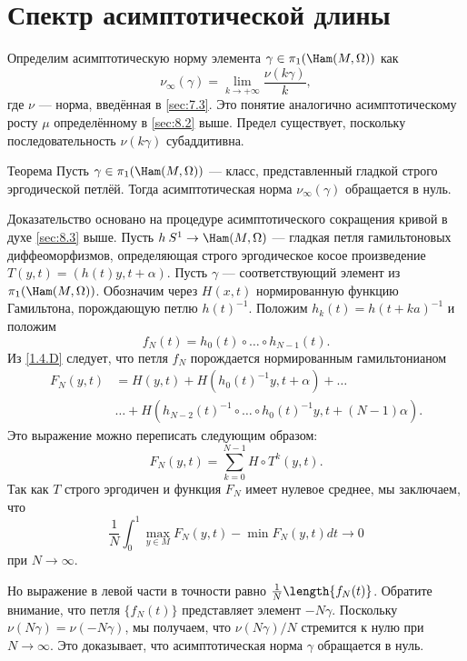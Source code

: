 \section{Спектр асимптотической длины}
Определим асимптотическую норму элемента $\gamma\in\pi_1(\Ham(M, \Omega))$ как
\[\nu_\infty(\gamma)=\lim_{k\to+\infty}\frac{\nu(k\gamma)}{k},\]
где $\nu$ --- норма, введённая в \ref{sec:7.3}. 
Это понятие аналогично асимптотическому росту $\mu$ определённому в \ref{sec:8.2} выше.
Предел существует, поскольку последовательность $\nu(k\gamma)$ субаддитивна.

\begin{thm}{Теорема}\label{11.2.A}
Пусть $\gamma\in\pi_1(\Ham(M,\Omega))$ --- класс, представленный гладкой строго эргодической петлёй.
Тогда асимптотическая норма $\nu_\infty ​​(\gamma)$ обращается в нуль.
\end{thm}

Доказательство основано на процедуре асимптотического сокращения кривой в духе \ref{sec:8.3} выше.
Пусть $h\: S^1 \to \Ham(M,\Omega)$ --- гладкая петля гамильтоновых диффеоморфизмов, определяющая строго эргодическое косое произведение $T(y, t) = (h(t)y, t+\alpha)$.
Пусть $\gamma$ --- соответствующий элемент из $\pi_1(\Ham(M, \Omega))$.
Обозначим через $H(x, t)$ нормированную функцию Гамильтона, порождающую петлю $h(t)^{-1}$.
Положим $h_k(t) = h(t + ka)^{-1}$ и положим 
\[f_N(t) = h_0(t) \circ \dots \circ h_{N-1}(t).\]
Из \ref{1.4.D} следует, что петля $f_N$ порождается нормированным гамильтонианом 
\begin{align*}
F_N(y,t)
&=
H(y,t)
+ H(h_0(t)^{-1}y,t+\alpha)
+\dots
\\
&\dots
+
H(h_{N-2} (t)^{-1} \circ \dots\circ h_0(t)^{-1}y, t + (N - 1)\alpha).
\end{align*}
Это выражение можно переписать следующим образом:
\[F_N(y, t) = \sum_{k=0}^{N-1} H\circ T^k(y, t).\]
Так как $T$ строго эргодичен и функция $F_N$ имеет нулевое среднее, мы заключаем, что
\[\frac1N\int_0^1\max_{y\in M}F_N(y, t) - \min F_N(y, t) dt \to 0\]
при $N \to \infty$.

Но выражение в левой части в точности равно $\frac1N\length\{f_N(t)\}$.
Обратите внимание, что петля $\{f_N(t)\}$ представляет элемент $-N\gamma$.
Поскольку $\nu(N\gamma) = \nu(-N\gamma)$, мы получаем, что $\nu(N\gamma)/N$ стремится к нулю при $N \to \infty$.
Это доказывает, что асимптотическая норма $\gamma$ обращается в нуль.

